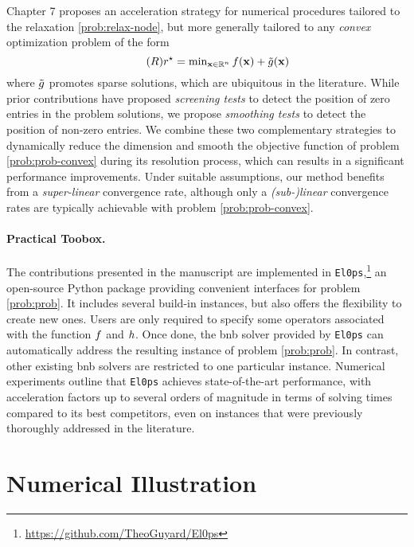 \documentclass[11pt]{article}
\begin{document}
Chapter 7 proposes an acceleration strategy for numerical procedures tailored to the relaxation \eqref{prob:relax-node}, but more generally tailored to any \emph{convex} optimization problem of the form
\begin{equation}
    \label{prob:prob-convex}
    \tag{$\rpb$}
    \opt{\robj} = \textstyle\min_{\pv \in \kR^{\pdim}} \lfunc(\pv) + \relaxrfunc(\pv)
\end{equation}
where $\tilde{g}$ promotes sparse solutions, which are ubiquitous in the literature.
While prior contributions have proposed \emph{screening tests} \cite{el2012safe} to detect the position of zero entries in the problem solutions, we propose \emph{smoothing tests} to detect the position of non-zero entries.
We combine these two complementary strategies to dynamically reduce the dimension and smooth the objective function of problem \eqref{prob:prob-convex} during its resolution process, which can results in a significant performance improvements.
Under suitable assumptions, our method benefits from a \emph{super-linear} convergence rate, although only a \emph{(sub-)linear} convergence rates are typically achievable with problem \eqref{prob:prob-convex}.

\paragraph{Practical Toobox.}
The contributions presented in the manuscript are implemented in \texttt{El0ps},\footnote{\url{https://github.com/TheoGuyard/El0ps}} an open-source Python package providing convenient interfaces for problem \eqref{prob:prob}.
It includes several build-in instances, but also offers the flexibility to create new ones.
Users are only required to specify some operators associated with the function $f$ and $h$.
Once done, the \gls{bnb} solver provided by \texttt{El0ps} can automatically address the resulting instance of problem \eqref{prob:prob}.
In contrast, other existing \gls{bnb} solvers are restricted to one particular instance.
Numerical experiments outline that \texttt{El0ps} achieves state-of-the-art performance, with acceleration factors up to several orders of magnitude in terms of solving times compared to its best competitors, even on instances that were previously thoroughly addressed in the literature.

\section{Numerical Illustration}
\label{sec:numerics}
\end{document}
